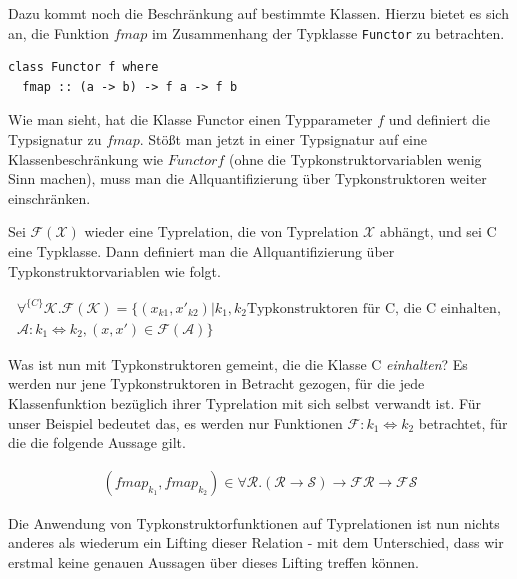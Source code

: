 Dazu kommt noch die Beschränkung auf bestimmte Klassen. Hierzu bietet es sich an, die Funktion $fmap$ im Zusammenhang der
Typklasse \texttt{Functor} zu betrachten.

\begin{verbatim}
class Functor f where
  fmap :: (a -> b) -> f a -> f b
\end{verbatim}

Wie man sieht, hat die Klasse Functor einen Typparameter $f$ und definiert die Typsignatur zu $fmap$. Stößt man jetzt in
einer Typsignatur auf eine Klassenbeschränkung wie $Functor f$ (ohne die Typkonstruktorvariablen wenig Sinn machen),
muss man die Allquantifizierung über Typkonstruktoren weiter einschränken.

Sei $\mathcal{F}(\mathcal{X})$ wieder eine Typrelation, die von Typrelation $\mathcal{X}$ abhängt, und sei C eine Typklasse.
Dann definiert man die Allquantifizierung über Typkonstruktorvariablen wie folgt.

\begin{align*}
\forall^{\{C\}} \mathcal{K} . \mathcal{F}(\mathcal{K}) = \{ 
(x_{k1}, x'_{k2}) | k_1, k_2 \text{Typkonstruktoren für C, die C einhalten},\\
\mathcal{A} : k_1 \Leftrightarrow k_2, (x, x') \in \mathcal{F}(\mathcal{A})
\}
\end{align*}

Was ist nun mit Typkonstruktoren gemeint, die die Klasse C \textit{einhalten}? Es werden nur jene Typkonstruktoren in Betracht gezogen,
für die jede Klassenfunktion bezüglich ihrer Typrelation mit sich selbst verwandt ist. Für unser Beispiel bedeutet das, es werden nur
Funktionen $\mathcal{F} : k_1 \Leftrightarrow k_2$ betrachtet, für die die folgende Aussage gilt.

\begin{align*}
(fmap_{k_1}, fmap_{k_2}) \in \forall \mathcal{R} . (\mathcal{R} \rightarrow \mathcal{S}) \rightarrow \mathcal{F} \mathcal{R}
\rightarrow \mathcal{F} \mathcal{S}
\end{align*}

Die Anwendung von Typkonstruktorfunktionen auf Typrelationen ist nun nichts anderes als wiederum ein Lifting dieser
Relation - mit dem Unterschied, dass wir erstmal keine genauen Aussagen über dieses Lifting treffen können.

